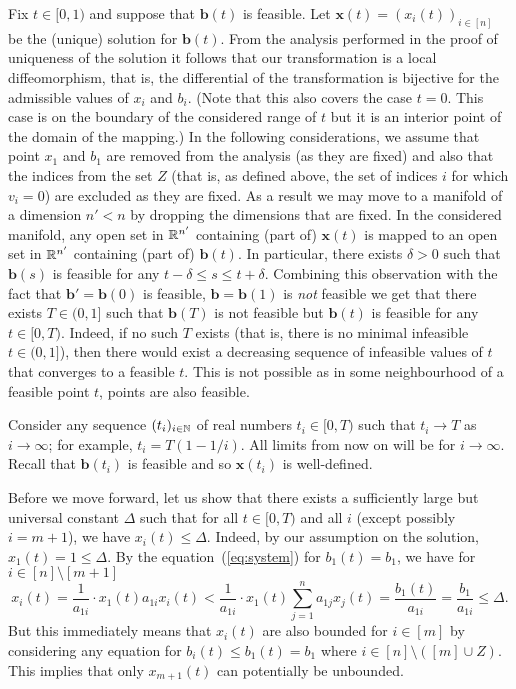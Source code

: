 Fix $t \in [0,1)$ and suppose that $\mathbf{b}(t)$ is feasible. Let $\mathbf{x}(t) = (x_i(t))_{i\in [n]}$ be the (unique) solution for $\mathbf{b}(t)$. From the analysis performed in the proof of uniqueness of the solution it follows that our transformation is a local diffeomorphism, that is, the differential of the transformation is bijective for the admissible values of $x_i$ and $b_i$. (Note that this also covers the case $t=0$. This case is on the boundary of the considered range of $t$ but it is an interior point of the domain of the mapping.) In the following considerations, we assume that point $x_1$ and $b_1$ are removed from the analysis (as they are fixed) and also that the indices from the set $Z$ (that is, as defined above, the set of indices $i$ for which $v_i=0$) are excluded as they are fixed. As a result we may move to a manifold of a dimension $n'<n$ by dropping the dimensions that are fixed. In the considered manifold, any open set in ${\mathbb R}^{n'}$ containing (part of) $\mathbf{x}(t)$ is mapped to an open set in ${\mathbb R}^{n'}$ containing (part of) $\mathbf{b}(t)$. In particular, there exists $\delta > 0$ such that $\mathbf{b}(s)$ is feasible for any $t - \delta \le s \le t + \delta$. Combining this observation with the fact that $\mathbf{b}'=\mathbf{b}(0)$ is feasible, $\mathbf{b}=\mathbf{b}(1)$ is \emph{not} feasible we get that there exists $T \in (0,1]$ such that $\mathbf{b}(T)$ is not feasible but $\mathbf{b}(t)$ is feasible for any $t \in [0,T)$. Indeed, if no such $T$ exists (that is, there is no minimal infeasible $t \in (0,1]$), then there would exist a decreasing sequence of infeasible values of $t$ that converges to a feasible $t$. This is not possible as in some neighbourhood of a feasible point $t$, points are also feasible.

Consider any sequence $(t_i)_{i \in {\mathbb N}}$ of real numbers $t_i \in [0,T)$ such that $t_i\to T$ as $i \to \infty$; for example, $t_i = T(1-1/i)$. All limits from now on will be for $i \to \infty$. Recall that $\mathbf{b}(t_i)$ is feasible and so $\mathbf{x}(t_i)$ is well-defined.

Before we move forward, let us show that there exists a sufficiently large but universal constant $\Delta$ such that for all $t \in [0,T)$ and all $i$ (except possibly $i=m+1$), we have $x_i(t) \le \Delta$. Indeed, by our assumption on the solution, $x_1(t)=1\le \Delta$. By the equation~(\ref{eq:system}) for $b_1(t) = b_1$, we have for $i\in[n]\setminus[m+1]$
$$
x_i(t) = \frac {1}{a_{1i}} \cdot x_1(t) a_{1i} x_i(t) < \frac {1}{a_{1i}} \cdot x_1(t) \sum_{j=1}^n a_{1j} x_j(t) = \frac {b_1(t)}{a_{1i}} = \frac {b_1}{a_{1i}} \le \Delta.
$$
But this immediately means that $x_i(t)$ are also bounded for $i\in[m]$ by considering any equation for $b_i(t) \le b_1(t) =b_1$ where $i\in[n]\setminus([m]\cup Z)$. This implies that only $x_{m+1}(t)$ can potentially be unbounded.

